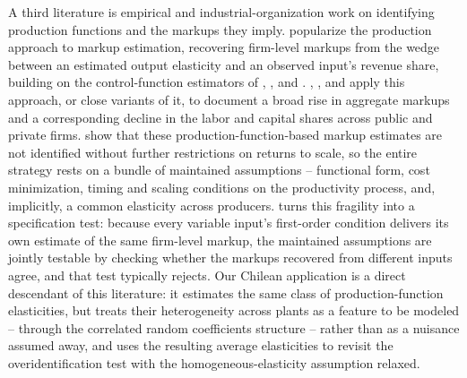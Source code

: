 \documentclass{article}
\begin{document}
A third literature is empirical and industrial-organization work on identifying production functions and the markups they imply. \cite{DeLoeckerWarzynski2012} popularize the production approach to markup estimation, recovering firm-level markups from the wedge between an estimated output elasticity and an observed input's revenue share, building on the control-function estimators of \cite{OlleyPakes1996}, \cite{LevinsohnPetrin2003}, and \cite{ACF2015}. \cite{DeLoeckerEeckhoutUnger2018}, \cite{KarabarbounisNeiman2018}, and \cite{Traina2018} apply this approach, or close variants of it, to document a broad rise in aggregate markups and a corresponding decline in the labor and capital shares across public and private firms. \cite{FlynnGandhiTraina2019} show that these production-function-based markup estimates are not identified without further restrictions on returns to scale, so the entire strategy rests on a bundle of maintained assumptions -- functional form, cost minimization, timing and scaling conditions on the productivity process, and, implicitly, a common elasticity across producers. \cite{Raval2023} turns this fragility into a specification test: because every variable input's first-order condition delivers its own estimate of the same firm-level markup, the maintained assumptions are jointly testable by checking whether the markups recovered from different inputs agree, and that test typically rejects. Our Chilean application is a direct descendant of this literature: it estimates the same class of production-function elasticities, but treats their heterogeneity across plants as a feature to be modeled -- through the correlated random coefficients structure -- rather than as a nuisance assumed away, and uses the resulting average elasticities to revisit the overidentification test with the homogeneous-elasticity assumption relaxed.
\end{document}
